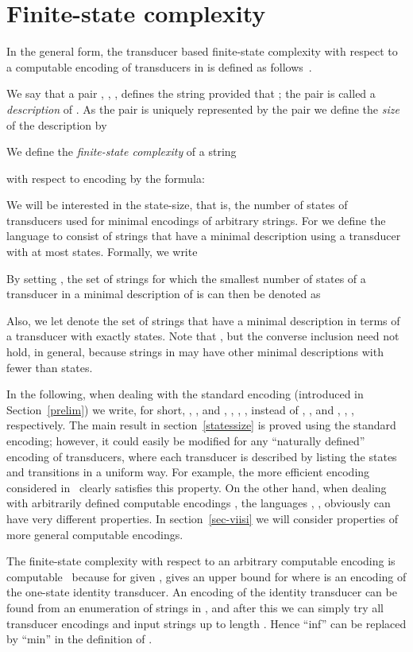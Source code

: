 \documentclass[copyright]{eptcs}
\begin{document}
\section{Finite-state complexity}
\label{fs-compl}

In the general form, the
transducer based finite-state complexity with respect
to a computable encoding  of transducers in 
is defined as follows~\cite{CSR}.

We say that a pair , , 
, 
defines
the string  provided that
; the pair  is called a 
{\it description} of .
As  the pair  is uniquely represented by 
the pair  we
define the {\em  size\/} 
of the description    by

We define the {\em finite-state complexity} of a string 

 with respect
to encoding    by the formula:


We will be interested in the state-size,
that is, the number of states of transducers
used for minimal encodings of arbitrary  strings.
For  we define the language  to consist of
strings  that have a minimal description using a transducer with
at most  states. Formally, we write

By setting ,
the set of strings  for which the
smallest number of states  of a transducer
in a minimal description of  
is   can 
then be denoted as

Also, we let  denote
the set of strings  that have a minimal description
in terms of a transducer with exactly  states. 
Note that , but
the converse inclusion need not hold, in general, because
strings in  may have other minimal
descriptions with fewer than  states.

In the following,
when dealing with the standard
encoding  (introduced in Section~\ref{prelim}) 
we write, for short, , ,
 and ,
, ,
,  instead
of , ,
 and ,
, , respectively.
The main result in section~\ref{statessize} is proved using
the standard encoding; however, it   could easily be
modified  for any 
``naturally defined'' encoding of transducers,  
where each transducer is described by listing the states and transitions
in a uniform way. 
For example, the more efficient encoding considered in~\cite{CSR}
clearly satisfies this property. On the other hand, 
when dealing with arbitrarily defined computable encodings ,
the languages , , obviously can have
very different properties. In  section~\ref{sec-viisi}
we will  consider properties of  more
general computable encodings.


The finite-state complexity with respect
to an arbitrary computable encoding  is computable~\cite{CSR}
because for given ,  gives an upper bound
for  where  is an encoding of
the one-state identity transducer.
An encoding of the identity transducer
can be found from an enumeration
of strings in , and after this we can simply try all transducer
encodings and input strings up to length . Hence
``inf'' can be replaced by ``min'' in the definition of .
\end{document}
